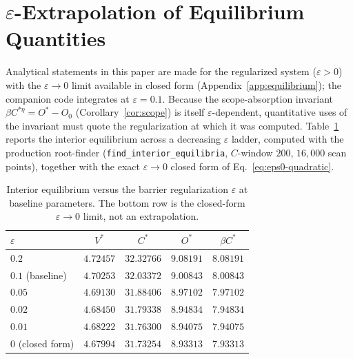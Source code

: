 \section{$\varepsilon$-Extrapolation of Equilibrium Quantities}
\label{app:epsilon}

Analytical statements in this paper are made for the regularized system
($\varepsilon>0$) with the $\varepsilon\to0$ limit available in closed form
(Appendix~\ref{app:equilibrium}); the companion code integrates at
$\varepsilon=0.1$. Because the scope-absorption invariant
$\beta C^{*\eta}=O^{*}-O_0$ (Corollary~\ref{cor:scope}) is itself
$\varepsilon$-dependent, quantitative uses of the invariant must quote the
regularization at which it was computed. Table~\ref{tab:epsilon} reports
the interior equilibrium across a decreasing $\varepsilon$ ladder, computed
with the production root-finder
(\texttt{find\_interior\_equilibria}, $C$-window $200$, $16{,}000$ scan
points), together with the exact $\varepsilon\to0$ closed form of
Eq.~\eqref{eq:eps0-quadratic}.

\begin{table}[h]
\centering
\caption{Interior equilibrium versus the barrier regularization
$\varepsilon$ at baseline parameters. The bottom row is the closed-form
$\varepsilon\to0$ limit, not an extrapolation.}
\label{tab:epsilon}
\vspace{0.4em}
\begin{tabular}{lcccc}
\toprule
$\varepsilon$ & $V^{*}$ & $C^{*}$ & $O^{*}$ & $\beta C^{*}$ \\
\midrule
$0.2$   & $4.72457$ & $32.32766$ & $9.08191$ & $8.08191$ \\
$0.1$ (baseline) & $4.70253$ & $32.03372$ & $9.00843$ & $8.00843$ \\
$0.05$  & $4.69130$ & $31.88406$ & $8.97102$ & $7.97102$ \\
$0.02$  & $4.68450$ & $31.79338$ & $8.94834$ & $7.94834$ \\
$0.01$  & $4.68222$ & $31.76300$ & $8.94075$ & $7.94075$ \\
\midrule
$0$ (closed form) & $4.67994$ & $31.73254$ & $8.93313$ & $7.93313$ \\
\bottomrule
\end{tabular}
\end{table}

